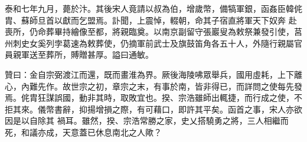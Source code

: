 \begin{pinyinscope}
 泰和七年九月，薨於汴。其後宋人竟請以叔為伯，增歲幣，備犒軍銀，函姦臣韓侂胄、蘇師旦首以獻而乞盟焉。訃聞，上震悼，輟朝，命其子宿直將軍天下奴奔
 赴喪所，仍命葬畢持繪像至都，將親臨奠。以南京副留守張巖叟為敕祭兼發引使，莒州刺史女奚列孛葛速為敕葬使，仍摘軍前武士及旗鼓笛角各五十人，外隨行親屬官員親軍送至葬所，賻贈甚厚。謚曰通敏。



 贊曰：金自宗弼渡江而還，既而畫淮為界。厥後海陵咈眾舉兵，國用虛耗，上下離心，內難先作。故世宗之初，章宗之末，有事於南，皆非得已，而詳問之使每先發焉。侂胄狂謀誤國，動非其時，取敗宜也。揆、宗浩雖師出輒捷，而行成之使，不拒其來。儀幣書辭，抑揚增損之際，有可藉口，即許其平矣。函首之事，宋人亦欲因是以自除其
 禍耳。雖然，揆、宗浩常勝之家，史乂搭驍勇之將，三人相繼而死，和議亦成，天意蓋已休息南北之人歟？



\end{pinyinscope}